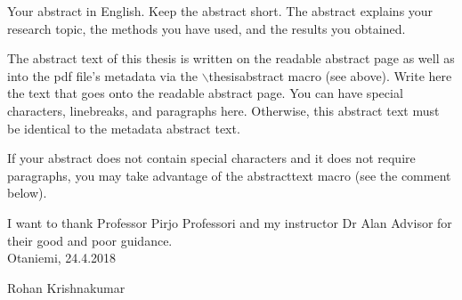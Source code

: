 \documentclass[english, 12pt, a4paper, elec, utf8, a-1b, online]{aaltothesis}
\date{24.4.2018}
\begin{document}
\makecoverpage

\makecopyrightpage


\begin{abstractpage}[english]
  Your abstract in English. Keep the abstract short. The abstract explains your
  research topic, the methods you have used, and the results you obtained.  
  
  The abstract text of this thesis is written on the readable abstract page as
  well as into the pdf file's metadata via the $\backslash$thesisabstract macro
  (see above). Write here the text that goes onto the readable abstract page.
  You can have special characters, linebreaks, and paragraphs here. Otherwise,
  this abstract text must be identical to the metadata abstract text.
  
  If your abstract does not contain special characters and it does not require
  paragraphs, you may take advantage of the abstracttext macro (see the comment
  below).
\end{abstractpage}


I want to thank Professor Pirjo Professori and my instructor Dr Alan Advisor for 
their good and poor guidance.\\

\vspace{5cm}
Otaniemi, 24.4.2018

\vspace{5mm}
{\hfill Rohan Krishnakumar \hspace{1cm}}
\end{document}
